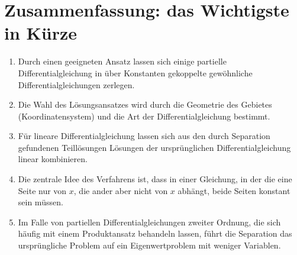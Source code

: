 \section{Zusammenfassung: das Wichtigste in Kürze}
\begin{enumerate}
\item
Durch einen geeigneten Ansatz lassen sich einige partielle
Differentialgleichung in über Konstanten gekoppelte gewöhnliche
Differentialgleichungen zerlegen.
\item
Die Wahl des Lösungsansatzes wird durch die Geometrie des Gebietes
(Koordinatensystem) und die Art der Differentialgleichung bestimmt.
\item
Für lineare Differentialgleichung lassen sich aus den durch Separation
gefundenen Teil\-lö\-sungen Lösungen der ursprünglichen Differentialgleichung
linear kombinieren.
\item
Die zentrale Idee des Verfahrens ist, dass in einer Gleichung,
in der die eine Seite nur von $x$, die ander aber nicht von $x$
abhängt, beide Seiten konstant sein müssen.
\item
Im Falle von partiellen Differentialgleichungen zweiter Ordnung, die
sich häufig mit einem Produktansatz behandeln lassen, führt die
Separation das ursprüngliche Problem auf ein Eigenwertproblem mit
weniger Variablen.
\end{enumerate}



